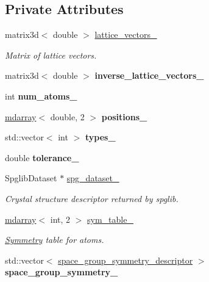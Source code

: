 \subsection*{Private Attributes}
\begin{DoxyCompactItemize}
\item 
matrix3d$<$ double $>$ \hyperlink{classsirius_1_1_symmetry_a1c35a9b0ec45df680af1758a2a7a774f}{lattice\+\_\+vectors\+\_\+}
\begin{DoxyCompactList}\small\item\em Matrix of lattice vectors. \end{DoxyCompactList}\item 
\hypertarget{classsirius_1_1_symmetry_a38ff3e1858eb3a1a6a10e8ae03c76691}{}matrix3d$<$ double $>$ {\bfseries inverse\+\_\+lattice\+\_\+vectors\+\_\+}\label{classsirius_1_1_symmetry_a38ff3e1858eb3a1a6a10e8ae03c76691}

\item 
\hypertarget{classsirius_1_1_symmetry_a76983e1e5764bc4314a3d990d794b90b}{}int {\bfseries num\+\_\+atoms\+\_\+}\label{classsirius_1_1_symmetry_a76983e1e5764bc4314a3d990d794b90b}

\item 
\hypertarget{classsirius_1_1_symmetry_a77381220038a1de70809fb3378104c9e}{}\hyperlink{classsddk_1_1mdarray}{mdarray}$<$ double, 2 $>$ {\bfseries positions\+\_\+}\label{classsirius_1_1_symmetry_a77381220038a1de70809fb3378104c9e}

\item 
\hypertarget{classsirius_1_1_symmetry_a2ce522ff9f5b84011e663e2902f6e13a}{}std\+::vector$<$ int $>$ {\bfseries types\+\_\+}\label{classsirius_1_1_symmetry_a2ce522ff9f5b84011e663e2902f6e13a}

\item 
\hypertarget{classsirius_1_1_symmetry_ad6822e1db11f56c7e488853f2a539bb5}{}double {\bfseries tolerance\+\_\+}\label{classsirius_1_1_symmetry_ad6822e1db11f56c7e488853f2a539bb5}

\item 
Spglib\+Dataset $\ast$ \hyperlink{classsirius_1_1_symmetry_abd01ed209aa1e2a1e3af374c63979e1f}{spg\+\_\+dataset\+\_\+}
\begin{DoxyCompactList}\small\item\em Crystal structure descriptor returned by spglib. \end{DoxyCompactList}\item 
\hyperlink{classsddk_1_1mdarray}{mdarray}$<$ int, 2 $>$ \hyperlink{classsirius_1_1_symmetry_a3d0703b85bf7c675f5129a6a9ef76084}{sym\+\_\+table\+\_\+}
\begin{DoxyCompactList}\small\item\em \hyperlink{classsirius_1_1_symmetry}{Symmetry} table for atoms. \end{DoxyCompactList}\item 
\hypertarget{classsirius_1_1_symmetry_a91f48efd864d483dc9715546e6596887}{}std\+::vector$<$ \hyperlink{structsirius_1_1space__group__symmetry__descriptor}{space\+\_\+group\+\_\+symmetry\+\_\+descriptor} $>$ {\bfseries space\+\_\+group\+\_\+symmetry\+\_\+}\label{classsirius_1_1_symmetry_a91f48efd864d483dc9715546e6596887}


\end{DoxyCompactItemize}
